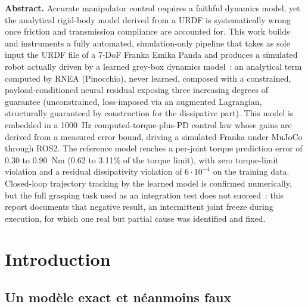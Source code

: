 \documentclass[a4paper, oneside]{article}
\begin{document}
\begin{center}
\begin{minipage}{0.88\textwidth}
\medskip
\textbf{Abstract.} Accurate manipulator control requires a faithful dynamics
model, yet the analytical rigid-body model derived from a URDF is
systematically wrong once friction and transmission compliance are accounted
for. This work builds and instruments a fully automated, simulation-only
pipeline that takes as sole input the URDF file of a 7-DoF Franka Emika Panda
and produces a simulated robot actually driven by a learned grey-box dynamics
model~: an analytical term computed by RNEA (Pinocchio), never learned,
composed with a constrained, payload-conditioned neural residual exposing
three increasing degrees of guarantee (unconstrained, loss-imposed via an
augmented Lagrangian, structurally guaranteed by construction for the
dissipative part). This model is embedded in a \SI{1000}{Hz} computed-torque-plus-PD
control law whose gains are derived from a measured error bound, driving a
simulated Franka under MuJoCo through ROS2. The reference model reaches a
per-joint torque prediction error of 0.30 to 0.90~Nm (0.62 to 3.11\% of the
torque limit), with zero torque-limit violation and a residual dissipativity
violation of $6\cdot 10^{-4}$ on the training data. Closed-loop trajectory
tracking by the learned model is confirmed numerically, but the full grasping
task used as an integration test does not succeed~: this report documents
that negative result, an intermittent joint freeze during execution, for
which one real but partial cause was identified and fixed.
\end{minipage}
\end{center}

\setcounter{tocdepth}{2}
\tableofcontents
\newpage

\section{Introduction}

\subsection{Un modèle exact et néanmoins faux}
\end{document}
